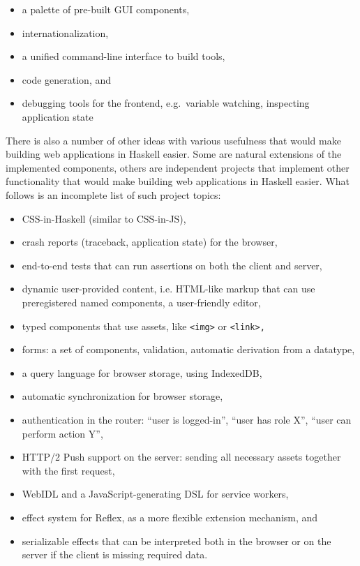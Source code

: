 \documentclass[english,odsaz]{fitthesis}
\begin{document}
\begin{itemize}
\item a palette of pre-built GUI components,
\item internationalization,
\item a unified command-line interface to build tools,
\item code generation, and
\item debugging tools for the frontend, e.g.~variable watching, inspecting application state
\end{itemize}

There is also a number of other ideas with various usefulness that would make
building web applications in Haskell easier. Some are natural extensions of the
implemented components, others are independent projects that implement other
functionality that would make building web applications in Haskell easier. What
follows is an incomplete list of such project topics:

\begin{itemize}
\item CSS-in-Haskell (similar to CSS-in-JS),
\item crash reports (traceback, application state) for the browser,
\item end-to-end tests that can run assertions on both the client and server,
\item dynamic user-provided content, i.e. HTML-like markup that can use preregistered named
components, a user-friendly editor,
\item typed components that use assets, like \texttt{<img>} or \texttt{<link>,}
\item forms: a set of components, validation, automatic derivation from a datatype,
\item a query language for browser storage, using IndexedDB,
\item automatic synchronization for browser storage,
\item authentication in the router: ``user is logged-in'', ``user has role X'', ``user
can perform action Y'',
\item HTTP/2 Push support on the server: sending all necessary assets together with
the first request,
\item WebIDL and a JavaScript-generating DSL for service workers,
\item effect system for Reflex, as a more flexible extension mechanism, and
\item serializable effects that can be interpreted both in the browser or on the
server if the client is missing required data.
\end{itemize}
\end{document}
